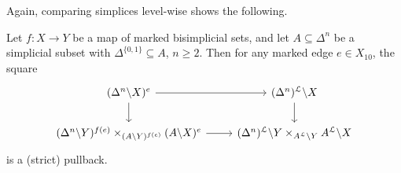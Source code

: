 \documentclass[main.tex]{subfiles}
\begin{document}
Again, comparing simplices level-wise shows the following.
\begin{lemma}
  \label{lemma:marked_pullback}
  Let $f\colon X \to Y$ be a map of marked bisimplicial sets, and let $A \subseteq \Delta^{n}$ be a simplicial subset with $\Delta^{\{0, 1\}} \subseteq A$, $n \geq 2$. Then for any marked edge $e \in X_{10}$, the square
  \begin{equation*}
    \begin{tikzcd}
      (\Delta^{n} \backslash X)^{e}
      \arrow[r]
      \arrow[d]
      & (\Delta^{n})^{\mathcal{L}} \backslash X
      \arrow[d]
      \\
      (\Delta^{n} \backslash Y)^{f(e)} \times_{(A\backslash Y)^{f(e)}} (A \backslash X)^{e}
      \arrow[r]
      & (\Delta^{n})^{\mathcal{L}} \backslash Y \times_{A^{\mathcal{L}}\backslash Y} A^{\mathcal{L}} \backslash X
    \end{tikzcd}
  \end{equation*}
  is a (strict) pullback.
\end{lemma}
\end{document}
